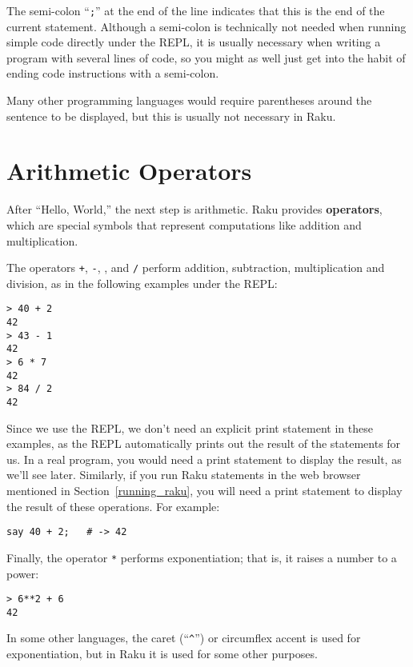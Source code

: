 The semi-colon ``{\tt ;}'' at the end of the line indicates 
that this is the end of the current statement. Although a 
semi-colon is technically not needed when running 
simple code directly under the REPL, it is usually 
necessary when writing a program with several lines of code, 
so you might as well just get into the habit of ending code 
instructions with a semi-colon.

Many other programming languages would require parentheses 
around the sentence to be displayed, but this is usually 
not necessary in Raku.

\section{Arithmetic Operators}

After ``Hello, World,'' the next step is arithmetic.  Raku provides
{\bf operators}, which are special symbols that represent computations
like addition and multiplication.  

The operators {\tt +}, {\tt -}, {\tt *}, and {\tt /} perform addition,
subtraction, multiplication and division, as in the following examples
under the REPL:

\begin{verbatim}
> 40 + 2
42
> 43 - 1
42
> 6 * 7
42
> 84 / 2
42
\end{verbatim}
%

Since we use the REPL, we don't need an explicit print 
statement in these examples, as the REPL automatically 
prints out the result of the statements for us. In a real 
program, you would need a print statement to display 
the result, as we'll see later. Similarly, if you run 
Raku statements in the web browser mentioned in 
Section~\ref{running_raku}, you will need a 
print statement to display the result of these operations. 
For example:

\begin{verbatim}
say 40 + 2;   # -> 42
\end{verbatim}


Finally, the operator {\tt **} performs exponentiation; that is,
it raises a number to a power:

\begin{verbatim}
> 6**2 + 6
42
\end{verbatim}
%
In some other languages, the caret (``\verb"^"'') or 
circumflex accent is used for exponentiation, but in 
Raku it is used for some other purposes.
%


